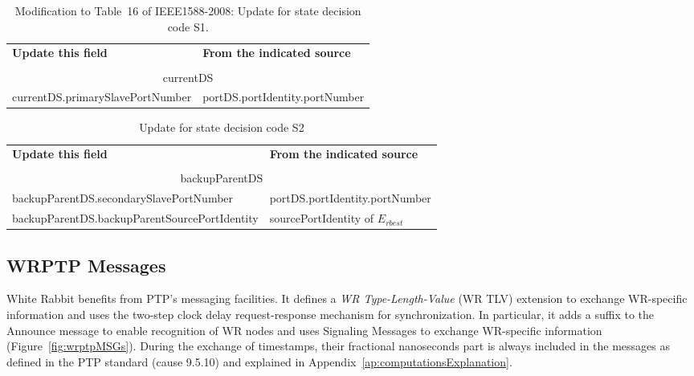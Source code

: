 \documentclass[a4paper, 12pt]{article}
\begin{document}
\begin{table}[tbp]
\caption{Modification to Table~16 of IEEE1588-2008: Update for state decision code S1.}
\centering
\begin{tabular}{| p{7.5cm} | p{7.5cm}|}           \hline
\textbf{Update this field}  		&  \textbf{From the indicated source}  	\\ 
					&  						\\ \hline
\multicolumn{2}{|c|}{currentDS}    								\\ \hline
currentDS.primarySlavePortNumber   	& portDS.portIdentity.portNumber		\\ \hline

\end{tabular}
\label{tab:modifiedS1}
\end{table}

\begin{table}[tbp]
\caption{Update for state decision code S2}
\centering
\begin{tabular}{| p{8.5cm} | p{6.5cm}|}          \hline
\textbf{Update this field}  			&  \textbf{From the indicated source}  	\\ 
						&  					\\ \hline
\multicolumn{2}{|c|}{backupParentDS} 							\\ \hline
backupParentDS.secondarySlavePortNumber 	& portDS.portIdentity.portNumber	\\ \hline
backupParentDS.backupParentSourcePortIdentity 	& sourcePortIdentity of $E_{rbest}$	\\ \hline

\end{tabular}
\label{tab:modifiedS2}
\end{table}

\newpage

\subsection{WRPTP Messages}
\label{sec:wrMSG}

White Rabbit benefits from PTP's messaging facilities. It defines a \textit{WR Type-Length-Value} 
(WR TLV) extension to exchange WR-specific information and uses the two-step clock delay 
request-response mechanism for synchronization. In particular, it adds a suffix to the Announce 
message to enable recognition of WR nodes and uses Signaling Messages to exchange WR-specific 
information (Figure~\ref{fig:wrptpMSGs}). During the exchange of timestamps, their
fractional nanoseconds part is always included in the messages as defined in the PTP standard 
(cause 9.5.10) and explained in Appendix~\ref{ap:computationsExplanation}.
\end{document}
